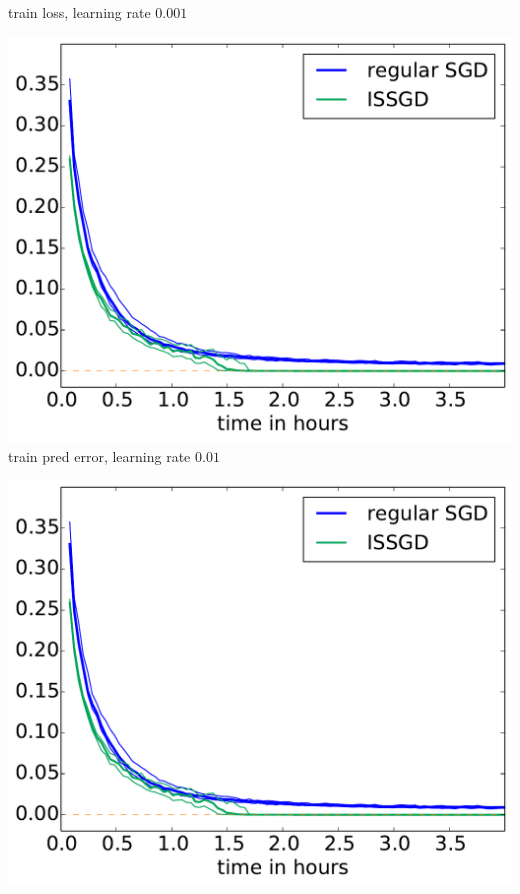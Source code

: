 \documentclass[a0,landscape]{a0poster}
\begin{document}
\begin{textblock}{0}
\begin{minipage}{35cm}
\begin{center}
\begin{minipage}{0.4\textwidth}
    train loss, learning rate $0.001$
  \end{minipage}
\end{center}
\begin{center}
  \begin{minipage}{0.4\textwidth}
    \center
    \includegraphics[width=\textwidth]{USGD_ISSGD_120_170_loss_train.pdf}
    train pred error, learning rate $0.01$
  \end{minipage}
  \begin{minipage}{0.4\textwidth}
    \center
    \includegraphics[width=\textwidth]{USGD_ISSGD_120_170_loss_train.pdf}

\end{minipage}
\end{center}
\end{minipage}
\end{textblock}
\end{document}
